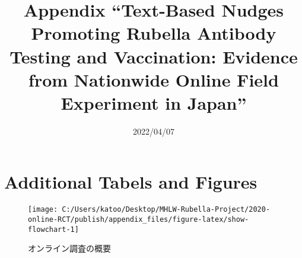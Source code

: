 \documentclass[
  11pt,
  a4paper,
]{article}
\title{Appendix
``Text-Based Nudges Promoting Rubella Antibody Testing and Vaccination:
Evidence from Nationwide Online Field Experiment in Japan''  }
\date{2022/04/07}
\begin{document}
\begin{spacing}{1}
  \maketitle
\end{spacing}

\hypertarget{appendix-appendix}{%
\appendix}


\hypertarget{additional-tabels-and-figures}{%
\section{Additional Tabels and Figures}\label{additional-tabels-and-figures}}

\begin{figure}[t]
\texttt{[image: C:/Users/katoo/Desktop/MHLW-Rubella-Project/2020-online-RCT/publish/appendix\_files/figure-latex/show-flowchart-1]} \caption{オンライン調査の概要}\label{fig:show-flowchart}
\end{figure}
\end{document}

